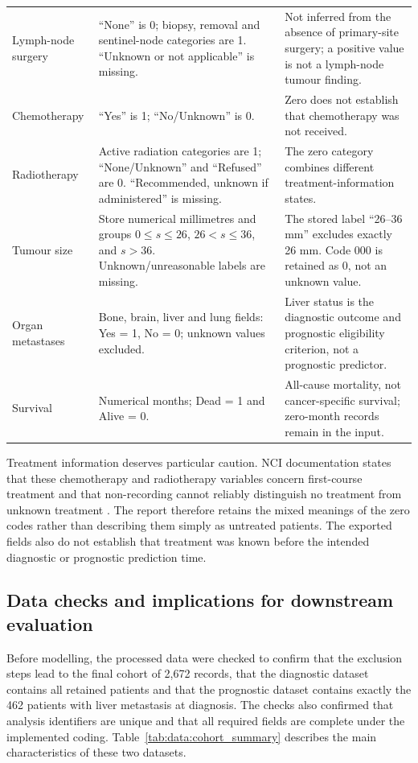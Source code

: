 \begin{longtable}{@{}>{\RaggedRight\arraybackslash}p{3.1cm}>{\RaggedRight\arraybackslash}p{6.3cm}>{\RaggedRight\arraybackslash}p{5.1cm}@{}}
Lymph-node surgery & ``None'' is 0; biopsy, removal and sentinel-node categories
are 1. ``Unknown or not applicable'' is missing. & Not inferred from the absence
of primary-site surgery; a positive value is not a lymph-node tumour finding. \\[0.6em]
Chemotherapy & ``Yes'' is 1; ``No/Unknown'' is 0. & Zero does not establish
that chemotherapy was not received. \\[0.6em]
Radiotherapy & Active radiation categories are 1; ``None/Unknown'' and
``Refused'' are 0. ``Recommended, unknown if administered'' is missing. &
The zero category combines different treatment-information states. \\[0.6em]
Tumour size & Store numerical millimetres and groups
$0\leq s\leq26$, $26<s\leq36$, and $s>36$. Unknown/unreasonable labels are
missing. & The stored label ``26--36 mm'' excludes exactly 26 mm.
Code 000 is retained as 0, not an unknown value. \\[0.6em]
Organ metastases & Bone, brain, liver and lung fields: Yes = 1, No = 0;
unknown values excluded. & Liver status is the diagnostic outcome and
prognostic eligibility criterion, not a prognostic predictor. \\[0.6em]
Survival & Numerical months; Dead = 1 and Alive = 0. & All-cause mortality,
not cancer-specific survival; zero-month records remain in the input. \\
\end{longtable}
\endgroup

Treatment information deserves particular caution. NCI documentation states
that these chemotherapy and radiotherapy variables concern first-course
treatment and that non-recording cannot reliably distinguish no treatment
from unknown treatment \citep{SEERTreatment2023}. The report therefore retains
the mixed meanings of the zero codes rather than describing them simply as
untreated patients. The exported fields also do not establish that treatment
was known before the intended diagnostic or prognostic prediction time.

\subsection{Data checks and implications for downstream evaluation}
\label{sec:data:checks}

Before modelling, the processed data were checked to confirm that the exclusion
steps lead to the final cohort of 2,672 records, that the diagnostic dataset
contains all retained patients and that the prognostic dataset contains exactly
the 462 patients with liver metastasis at diagnosis. The checks also confirmed
that analysis identifiers are unique and that all required fields are complete
under the implemented coding. Table~\ref{tab:data:cohort_summary} describes the
main characteristics of these two datasets.

